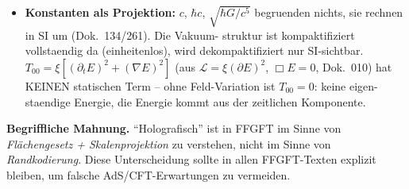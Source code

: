 \begin{itemize}
        ($L_0=\xi\ell_P$ statt $R_H$), nicht an der Energie-Längen-Dualität
        (in nat.~Einheiten sind beide über $\hbar c$ dual). Wohl aber existiert
        die Kette $\xi\to E_H=E_0\xi^{41/4}\to R_H=\hbar c/E_H\to H_0=E_H/\hbar$
        ($\approx 66{,}2$ km/s/Mpc; Dok.~026/182), mit $\hbar c$ als SI-Faktor.
        $H_0$ ist damit ein geometrischer, als Expansion fehlgedeuteter
        Koeffizient; modellneutral bleibt die Observable $z(d)$.
        Der Exponent $41/4$ ist an den gemessenen $H_0$ kalibriert, nicht
        aus $\xi$ hergeleitet.
  \item \textbf{Konstanten als Projektion:} $c$, $\hbar c$, $\sqrt{\hbar G/c^5}$
        begruenden nichts, sie rechnen in SI um (Dok.~134/261). Die Vakuum-
        struktur ist kompaktifiziert vollstaendig da (einheitenlos), wird
        dekompaktifiziert nur SI-sichtbar. $T_{00}=\xi[(\partial_t E)^2+(\nabla E)^2]$
        (aus $\mathcal{L}=\xi(\partial E)^2$, $\Box E=0$, Dok.~010) hat KEINEN
        statischen Term -- ohne Feld-Variation ist $T_{00}=0$: keine eigen-
        staendige Energie, die Energie kommt aus der zeitlichen Komponente.
\end{itemize}

\noindent
\textbf{Begriffliche Mahnung.} \enquote{Holografisch} ist in FFGFT im Sinne
von \emph{Flächengesetz + Skalenprojektion} zu verstehen, nicht im Sinne von
\emph{Randkodierung}. Diese Unterscheidung sollte in allen FFGFT-Texten
explizit bleiben, um falsche AdS/CFT-Erwartungen zu vermeiden.
